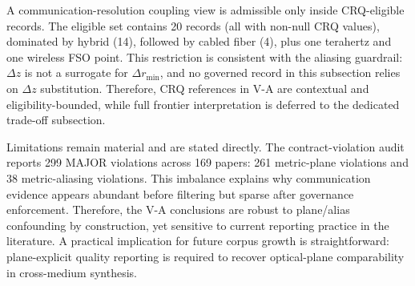 \documentclass[lettersize,journal]{IEEEtran}
\begin{document}
A communication-resolution coupling view is admissible only inside CRQ-eligible records. The eligible set contains 20 records (all with non-null CRQ values), dominated by hybrid (14), followed by cabled fiber (4), plus one terahertz and one wireless FSO point. This restriction is consistent with the aliasing guardrail: $\Delta z$ is not a surrogate for $\Delta r_{\min}$, and no governed record in this subsection relies on $\Delta z$ substitution. Therefore, CRQ references in V-A are contextual and eligibility-bounded, while full frontier interpretation is deferred to the dedicated trade-off subsection.

Limitations remain material and are stated directly. The contract-violation audit reports 299 MAJOR violations across 169 papers: 261 metric-plane violations and 38 metric-aliasing violations. This imbalance explains why communication evidence appears abundant before filtering but sparse after governance enforcement. Therefore, the V-A conclusions are robust to plane/alias confounding by construction, yet sensitive to current reporting practice in the literature. A practical implication for future corpus growth is straightforward: plane-explicit quality reporting is required to recover optical-plane comparability in cross-medium synthesis.
\end{document}
